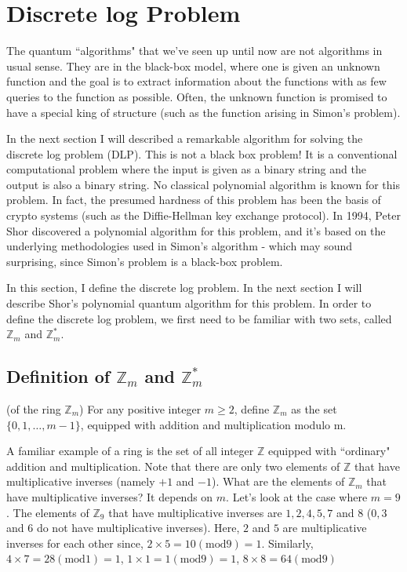 \chapter{Discrete log Problem}
The quantum ``algorithms" that we've seen up until now are not algorithms in usual sense. They are in the black-box model, where one is given an unknown function and the goal is to extract information about the functions with as few queries to the function as possible. Often, the unknown function is promised to have a special king of structure (such as the function arising in Simon's problem).

In the next section I will described a remarkable algorithm for solving the discrete log problem (DLP). This is not a black box problem! It is a conventional computational problem where the input is given as a binary string and the output is also a binary string. No classical polynomial algorithm is known for this problem. In fact, the presumed hardness of this problem has been the basis of crypto systems (such as the Diffie-Hellman key exchange protocol). In 1994, Peter Shor discovered a polynomial algorithm for this problem, and it's based on the underlying methodologies used in Simon's algorithm - which may sound surprising, since Simon's problem is a black-box problem.

In this section, I define the discrete log problem. In the next section I will describe Shor's polynomial quantum algorithm for this problem. In order to define the discrete log problem, we first need to be familiar with two sets, called $\mathbb{Z}_m$ and $\mathbb{Z}_m^*$.

\section{Definition of \texorpdfstring{$\mathbb{Z}_m$ and $\mathbb{Z}_m^*$}{Zm and Zm*}}
\begin{definition}
    (of the ring $\mathbb{Z}_m$) For any positive integer $m\geq 2$, define $\mathbb{Z}_m$ as the set $\{0,1,\ldots,m-1\}$, equipped with addition and multiplication modulo m.
\end{definition}

A familiar example of a ring is the set of all integer $\mathbb{Z}$ equipped with ``ordinary" addition and multiplication. Note that there are only two elements of $\mathbb{Z}$ that have multiplicative inverses (namely $+1$ and $-1$). What are the elements of $\mathbb{Z}_m$ that have multiplicative inverses? It depends on $m$. Let's look at the case where $m=9$. The elements of $\mathbb{Z}_9$ that have multiplicative inverses are $1,2,4,5,7$ and $8$ ($0,3$ and $6$ do not have multiplicative inverses). Here, $2$ and $5$ are multiplicative inverses for each other since, $2\times 5 =10 (\text{mod} 9) = 1$. Similarly, $4 \times 7 =28 (\text{mod} 1) = 1$, $1\times 1 = 1 (\text{mod} 9)=1$, $8 \times 8 = 64 (\text{mod} 9 )$ 

